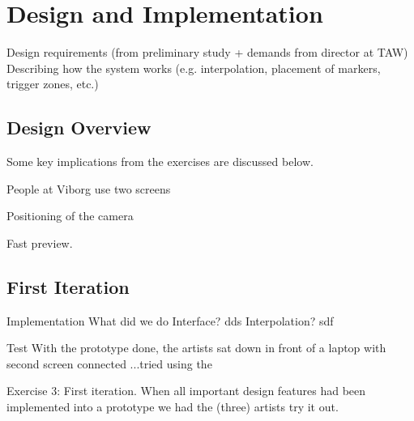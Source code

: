 \section{Design and Implementation}
Design requirements (from preliminary study + demands from director at TAW)	
Describing how the system works (e.g. interpolation, placement of markers, trigger zones, etc.)

\subsection{Design Overview}
Some key implications from the exercises are discussed below.

People at Viborg use two screens

Positioning of the camera

Fast preview.

\subsection{First Iteration}
Implementation
What did we do
Interface?
dds
Interpolation?
sdf

Test
With the prototype done, the artists sat down in front of a laptop with  second screen connected ...tried using the 


Exercise 3: First iteration.
When all important design features had been implemented into a prototype we had the (three) artists try it out.
